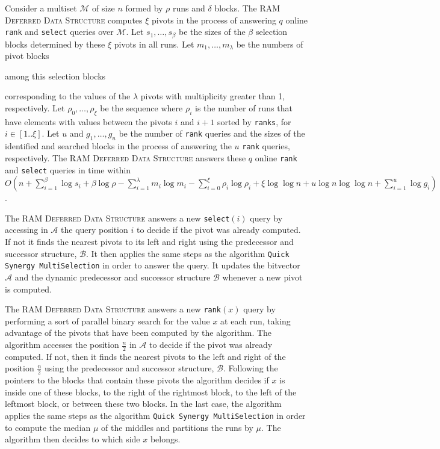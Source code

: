 \begin{INUTILE}
  \begin{theorem}\label{theo:online-ram}
    Consider a multiset $\mathcal{M}$ of size $n$ formed by $\rho$
    runs and $\delta$ blocks. The \textsc{RAM Deferred Data Structure}
    computes $\xi$ pivots in the process of answering $q$ online
    \texttt{rank} and \texttt{select} queries over $\mathcal{M}$. Let
    $s_1, \dots, s_{\beta}$ be the sizes of the $\beta$ selection
    blocks determined by these $\xi$ pivots in all runs. Let
    $m_1, \dots, m_\lambda$ be the numbers of pivot blocks
    \begin{LONG}
      among this selection blocks
    \end{LONG}
    corresponding to the values of the $\lambda$ pivots with
    multiplicity greater than 1, respectively.  Let
    $\rho_0, \dots, \rho_\xi$ be the sequence where $\rho_i$ is the
    number of runs that have elements with values between the pivots
    $i$ and $i+1$ sorted by \texttt{ranks}, for $i\in[1..\xi]$.  Let
    $u$ and $g_1, \dots, g_u $ be the number of \texttt{rank} queries
    and the sizes of the identified and searched blocks in the process
    of answering the $u$ \texttt{rank} queries, respectively. The
    \textsc{RAM Deferred Data Structure} answers these $q$ online
    \texttt{rank} and \texttt{select} queries in time within
    $O(n + \sum^{\beta}_{i=1}\log{s_i} + \beta\log{\rho} -
    \sum^{\lambda}_{i=1}m_i\log{m_i} -
    \sum^{\xi}_{i=0}\rho_i\log{\rho_i} + \xi\log\log{n} +
    u\log{n}\log\log{n} + \sum^{u}_{i=1}\log{g_i})$.
  \end{theorem}
\end{INUTILE}

The \textsc{RAM Deferred Data Structure} answers a new
\texttt{select}$(i)$ query by accessing in $\mathcal{A}$ the query
position $i$ to decide if the pivot was already computed. If not it finds
the nearest pivots to its left and right using the predecessor and
successor structure, $\mathcal{B}$. It then
applies the same steps as the algorithm \texttt{Quick Synergy
  MultiSelection} in order to answer the query. It updates the
bitvector $\mathcal{A}$ and the dynamic predecessor and successor
structure $\mathcal{B}$ whenever a new pivot is computed.

The \textsc{RAM Deferred Data Structure} answers a new
\texttt{rank}$(x)$ query by performing a sort of parallel binary
search for the value $x$ at each run, taking advantage of the pivots
that have been computed by the algorithm. The algorithm accesses the
position $\frac{n}{2}$ in $\mathcal{A}$ to decide if the pivot was
already computed. If not, then it finds the nearest
pivots to the left and right of the position $\frac{n}{2}$ using the
predecessor and successor structure, $\mathcal{B}$. Following the
pointers to the blocks that contain these pivots the algorithm decides
if $x$ is inside one of these blocks, to the right of the rightmost
block, to the left of the leftmost block, or between these two
blocks. In the last case, the algorithm applies the same steps as the
algorithm \texttt{Quick Synergy MultiSelection} in order to compute
the median $\mu$ of the middles and partitions the runs by
$\mu$. The algorithm then decides to which side $x$ belongs.

